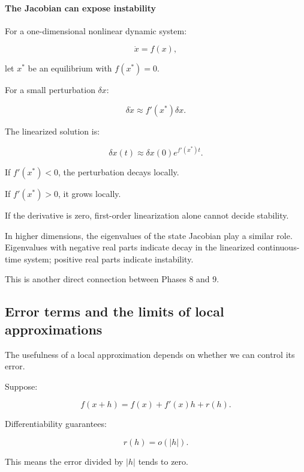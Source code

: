 \paragraph{The Jacobian can expose instability}\label{02-foundations-ii-ch021-the-jacobian-can-expose-instability}

\hypertarget{02-foundations-ii-ch021-the-jacobian-can-expose-instability}{}

For a one-dimensional nonlinear dynamic system:

\[
\dot x=f(x),
\]

let \(x^\ast\) be an equilibrium with \(f(x^\ast)=0\).

For a small perturbation \(\delta x\):

\[
\delta\dot x\approx f'(x^\ast)\delta x.
\]

The linearized solution is:

\[
\delta x(t)\approx\delta x(0)e^{f'(x^\ast)t}.
\]

If \(f'(x^\ast)<0\), the perturbation decays locally.

If \(f'(x^\ast)>0\), it grows locally.

If the derivative is zero, first-order linearization alone cannot decide stability.

In higher dimensions, the eigenvalues of the state Jacobian play a similar role. Eigenvalues with negative real parts indicate decay in the linearized continuous-time system; positive real parts indicate instability.

This is another direct connection between Phases 8 and 9.

\subsection{Error terms and the limits of local approximations}\label{02-foundations-ii-ch021-error-terms-and-the-limits-of-local-approximations}

\hypertarget{02-foundations-ii-ch021-error-terms-and-the-limits-of-local-approximations}{}

The usefulness of a local approximation depends on whether we can control its error.

Suppose:

\[
f(x+h)=f(x)+f'(x)h+r(h).
\]

Differentiability guarantees:

\[
r(h)=o(|h|).
\]

This means the error divided by \(|h|\) tends to zero.

